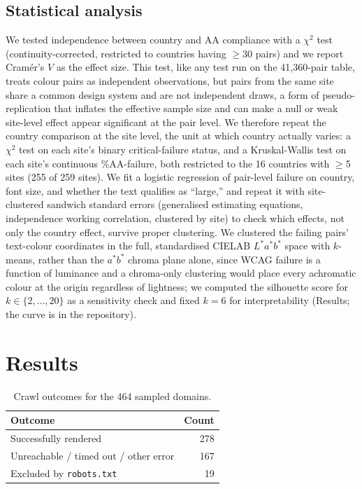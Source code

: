\documentclass[10pt]{article}
\begin{document}
\subsection{Statistical analysis}
We tested independence between country and AA compliance with a $\chi^2$ test (continuity-\-corrected, restricted to countries having $\geq 30$ pairs) and we report Cram\'{e}r's $V$ as the effect size. This test, like any test run on the 41,360-pair table, treats colour pairs as independent observations, but pairs from the same site share a common design system and are not independent draws, a form of pseudo-replication that inflates the effective sample size and can make a null or weak site-level effect appear significant at the pair level. We therefore repeat the country comparison at the site level, the unit at which country actually varies: a $\chi^2$ test on each site's binary critical-failure status, and a Kruskal-Wallis test on each site's continuous \%AA-failure, both restricted to the 16 countries with $\geq$5 sites (255 of 259 sites). We fit a logistic regression of pair-level failure on country, font size, and whether the text qualifies as ``large,'' and repeat it with site-clustered sandwich standard errors (generalised estimating equations, independence working correlation, clustered by site) to check which effects, not only the country effect, survive proper clustering. We clustered the failing pairs' text-colour coordinates in the full, standardised CIELAB $L^*a^*b^*$ space with $k$-means, rather than the $a^*b^*$ chroma plane alone, since WCAG failure is a function of luminance and a chroma-only clustering would place every achromatic colour at the origin regardless of lightness; we computed the silhouette score for $k \in \{2,\dots,20\}$ as a sensitivity check and fixed $k=6$ for interpretability (Results; the curve is in the repository).

\section{Results}

\begin{table}[h]
\centering
\caption{Crawl outcomes for the 464 sampled domains.}
\label{tab:crawl-outcomes}
\begin{tabular}{lr}
\toprule
Outcome & Count \\
\midrule
Successfully rendered & 278 \\
Unreachable / timed out / other error & 167 \\
Excluded by \texttt{robots.txt} & 19 \\
\bottomrule
\end{tabular}
\end{table}
\end{document}
